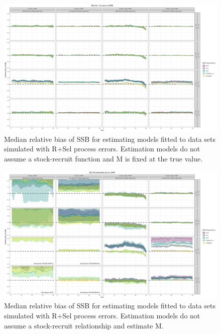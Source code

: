 \documentclass[
  12pt,
]{article}
\begin{document}
\begin{landscape}
\begin{figure}
\caption{Median relative bias of SSB for estimating models fitted to data sets simulated with R+Sel process errors.  Estimation models do not assume a stock-recruit function and M is fixed at the true value.}\label{Sel_om_em_R_MF_relbias_ssb}
\begin{center}
\includegraphics[width = \textwidth]{Sel_om_R_MF_relbias_ssb.png}
\end{center}
\end{figure}
\end{landscape}

\begin{landscape}
\begin{figure}
\caption{Median relative bias of SSB for estimating models fitted to data sets simulated with R+Sel process errors. Estimation models do not assume a stock-recruit relationship and estimate M.}\label{Sel_om_em_R_ME_relbias_ssb}
\begin{center}
\includegraphics[width = \textwidth]{Sel_om_R_ME_relbias_ssb.png}
\end{center}
\end{figure}
\end{landscape}
\end{document}
